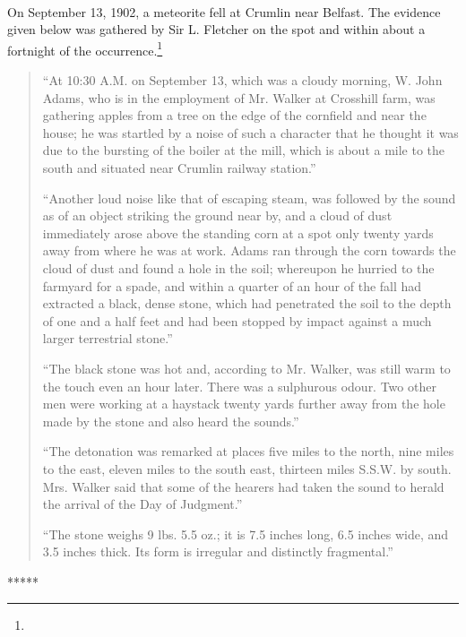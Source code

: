 \documentclass[a4paper, 12pt, oneside]{article}
\begin{document}
\paragraph{}
On September 13, 1902, a meteorite fell at Crumlin near Belfast. The evidence given below was gathered by Sir L. Fletcher on the spot and within about a fortnight of the occurrence.\footnote{}
\begin{quotation}
``At 10:30 A.M. on September 13, which was a cloudy morning, W. John Adams, who is in the employment of Mr. Walker at Crosshill farm, was gathering apples from a tree on the edge of the cornfield and near the house; he was startled by a noise of such a character that he thought it was due to the bursting of the boiler at the mill, which is about a mile to the south and situated near Crumlin railway station.''

``Another loud noise like that of escaping steam, was followed by the sound as of an object striking the ground near by, and a cloud of dust immediately arose above the standing corn at a spot only twenty yards away from where he was at work. Adams ran through the corn towards the cloud of dust and found a hole in the soil; whereupon he hurried to the farmyard for a spade, and within a quarter of an hour of the fall had extracted a black, dense stone, which had penetrated the soil to the depth of one and a half feet and had been stopped by impact against a much larger terrestrial stone.''

``The black stone was hot and, according to Mr. Walker, was still warm to the touch even an hour later. There was a sulphurous odour. Two other men were working at a haystack twenty yards further away from the hole made by the stone and also heard the sounds.''

``The detonation was remarked at places five miles to the north, nine miles to the east, eleven miles to the south east, thirteen miles S.S.W. by south. Mrs. Walker said that some of the hearers had taken the sound to herald the arrival of the Day of Judgment.''

``The stone weighs 9 lbs. 5.5 oz.; it is 7.5 inches long, 6.5 inches wide, and 3.5 inches thick. Its form is irregular and distinctly fragmental.''
\end{quotation}
\centerline{*\hspace{15mm}*\hspace{15mm}*\hspace{15mm}*\hspace{15mm}*}
\bigskip
\end{document}
